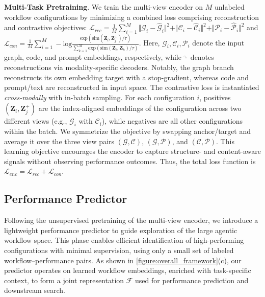 \textbf{Multi-Task Pretraining}. We train the multi-view encoder on $M$ unlabeled workflow configurations by minimizing a combined loss comprising reconstruction and contrastive objectives: $\mathcal{L}_{rec} = \frac{1}{M} \sum_{i=1}^M \Vert\mathcal{G}_i-\hat{\mathcal{G}}_i\Vert^2 + \Vert\mathcal{C}_i-\hat{\mathcal{C}}_i\Vert^2 + \Vert\mathcal{P}_i-\hat{\mathcal{P}}_i\Vert^2$ and $\mathcal{L}_{con} = \frac{1}{M} \sum_{i=1}^M -\mathrm{log}\frac{\mathrm{exp}(\mathrm{sim}(\mathbf{Z}_i, \mathbf{Z}_j^+)/\tau)}{\sum_{k=1}^M \mathrm{exp}(\mathrm{sim}(\mathbf{Z}_i, \mathbf{Z}_k)/\tau)}$. Here, $\mathcal{G}_i, \mathcal{C}_i, \mathcal{P}_i$ denote the input graph, code, and prompt embeddings, respectively, while $\hat{\cdot}$ denotes reconstructions via modality-specific decoders. Notably, the graph branch reconstructs its own embedding target with a stop-gradient, whereas code and prompt/text are reconstructed in input space. The contrastive loss is instantiated \emph{cross-modally} with in-batch sampling. For each configuration $i$, positives $(\mathbf{Z}_i,\mathbf{Z}_j^+)$ are the index-aligned embeddings of the configuration across two different views (e.g., $\mathcal{G}_i$ with $\mathcal{C}_i$), while negatives are all other configurations within the batch. We symmetrize the objective by swapping anchor/target and average it over the three view pairs $(\mathcal{G},\mathcal{C})$, $(\mathcal{G},\mathcal{P})$, and $(\mathcal{C},\mathcal{P})$. This learning objective encourages the encoder to capture structure- and content-aware signals without observing performance outcomes. Thus, the total loss function is $\mathcal{L}_{enc} = \mathcal{L}_{rec} + \mathcal{L}_{con}$.



\subsection{Performance Predictor} \label{section:predictor_search}
Following the unsupervised pretraining of the multi-view encoder, we introduce a lightweight performance predictor to guide exploration of the large agentic workflow space. This phase enables efficient identification of high-performing configurations with minimal supervision, using only a small set of labeled workflow–performance pairs. As shown in \autoref{figure:overall_framework}(c), our predictor operates on learned workflow embeddings, enriched with task-specific context, to form a joint representation $\mathcal{F}$ used for performance prediction and downstream search.

